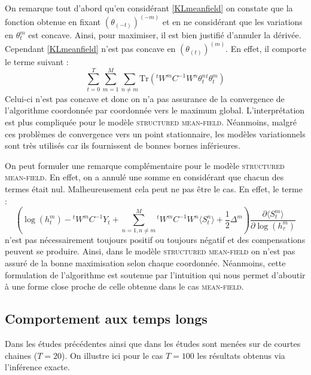\documentclass[10pt,a4paper]{article}
\newcommand{\meanfield}{\textsc{mean-field}}
\newcommand{\structmeanfield}{\textsc{structured mean-field}}
\begin{document}
 On remarque tout d'abord qu'en considérant \ref{KLmeanfield} on constate que la fonction obtenue en
 fixant $(\theta_{(-t)})^{(-m)}$ et en ne considérant que les variations en $\theta_t^m$ est concave.
 Ainsi, pour maximiser, il est bien justifié d'annuler la dérivée. Cependant \ref{KLmeanfield} n'est
 pas concave en $(\theta_{(t)})^{(m)}$. En effet, il comporte le terme suivant :
 \begin{equation}
 \underset{t=0}{\overset{T}{\sum}}\underset{m=1}{\overset{M}{\sum}}\underset{n \neq m}{\sum}
 \text{Tr}\left( {}^tW^m C^{-1}W^n\theta_t^n {}^t\theta_t^m\right)
 \end{equation}
 Celui-ci n'est pas concave et donc on n'a pas assurance de la convergence de l'algorithme 
 coordonnée par coordonnée vers le maximum global. L'interprétation est plus compliquée pour le
 modèle \structmeanfield. Néanmoins, malgré ces problèmes de convergence vers un point stationnaire, 
 les modèles variationnels sont très utilisés car ils fournissent de bonnes bornes inférieures.
 
 On peut formuler une remarque complémentaire pour le modèle \structmeanfield{}. En effet, on a annulé
 une somme en considérant que chacun des termes était nul. Malheureusement cela peut ne pas être le cas.
 En effet, le terme :
 \begin{equation}
 \left( 
\log(h_t^m) -{}^t W^mC^{-1}Y_t + \underset{n=1, n \neq 
m}{\overset{M}{\sum}}{}^t W^m C^{-1} W^n \langle S_t^n \rangle + 
\frac{1}{2}\Delta^m \right) \frac{\partial \langle S_t^m \rangle}{\partial 
\log(h_{\tau}^m)}
 \end{equation}
 n'est pas nécessairement toujours positif ou toujours négatif et des compensations peuvent se produire. Ainsi, dans le modèle \structmeanfield{} on n'est pas assuré de la bonne maximisation selon chaque coordonnée. Néanmoins, cette formulation de l'algorithme est soutenue par l'intuition qui nous permet 
 d'aboutir à une forme close proche de celle obtenue dans le cas \meanfield{}.

\subsection{Comportement aux temps longs\label{app:tempslongs}}
 Dans les études précédentes ainsi que dans \cite{ghahramani1997factorial} les études sont menées sur de
  courtes chaines ($T=20$). On illustre ici pour le cas $T = 100$ les résultats obtenus via l'inférence 
  exacte.
  
\end{document}
